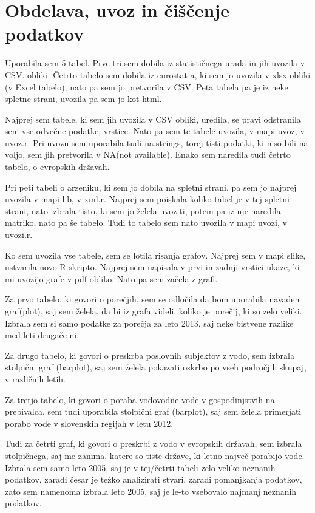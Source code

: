 \documentclass[11pt,a4paper]{article}
\begin{document}
\newpage
\section{Obdelava, uvoz in čiščenje podatkov}
Uporabila sem 5 tabel.
Prve tri sem dobila iz statističnega urada in jih uvozila v CSV. obliki.
Četrto tabelo sem dobila iz eurostat-a, ki sem jo uvozila v xlsx obliki (v Excel tabelo), nato pa sem jo pretvorila v CSV. Peta tabela pa je iz neke spletne strani, uvozila pa sem jo kot html.

Najprej sem tabele, ki sem jih uvozila v CSV obliki, uredila, se pravi odstranila sem vse odvečne podatke, vrstice. Nato pa sem te tabele uvozila, v mapi uvoz, v uvoz.r. Pri uvozu sem uporabila tudi na.strings, torej tisti podatki, ki niso bili na voljo, sem jih pretvorila v NA(not available). Enako sem naredila tudi četrto tabelo, o evropskih državah.

Pri peti tabeli o arzeniku, ki sem jo dobila na spletni strani, pa sem jo najprej uvozila v mapi lib, v xml.r. Najprej sem poiskala koliko tabel je v tej spletni strani, nato izbrala tisto, ki sem jo želela uvoziti, potem pa iz nje naredila matriko, nato pa še tabelo. Tudi to tabelo sem nato uvozila v mapi uvozi, v uvozi.r.

Ko sem uvozila vse tabele, sem se lotila risanja grafov. Najprej sem v mapi slike, ustvarila novo R-skripto. Najprej sem napisala v prvi in zadnji vrstici ukaze, ki mi uvozijo grafe v pdf obliko. Nato pa sem začela z grafi. 

Za prvo tabelo, ki govori o porečjih, sem se odločila da bom uporabila navaden graf(plot), saj sem želela, da bi iz grafa videli, koliko je porečij, ki so zelo veliki. Izbrala sem si samo podatke za porečja za leto 2013, saj neke bistvene razlike med leti drugače ni. 

Za drugo tabelo, ki govori o preskrba poslovnih subjektov z vodo, sem izbrala stolpični graf (barplot), saj sem želela pokazati oskrbo po vseh področjih skupaj, v različnih letih. 

Za tretjo tabelo, ki govori o poraba vodovodne vode v gospodinjstvih na prebivalca, sem tudi uporabila stolpični graf (barplot), saj sem želela primerjati porabo vode v slovenskih regijah v letu 2012. 

Tudi za četrti graf, ki govori o preskrbi z vodo v evropskih državah, sem izbrala stolpičnega, saj me zanima, katere so tiste države, ki letno največ porabijo vode. Izbrala sem samo leto 2005, saj je v tej/četrti tabeli zelo veliko neznanih podatkov, zaradi česar je težko analizirati stvari, zaradi pomanjkanja podatkov, zato sem namenoma izbrala leto 2005, saj je le-to vsebovalo najmanj neznanih podatkov.
\end{document}
